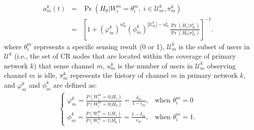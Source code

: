 \documentclass[12pt,onecolumn,draftclsnofoot]{IEEEtran} %
\begin{document}
\begin{eqnarray}\label{eq:AvailProb1}
	a_m^k(t) &=& \Pr(H_0|W_i^m=\theta_i^m, \; i \in \mathcal{U}_m^k, \pi_m^k) 
	         \nonumber \\ 
	&=& \left[ 1 + \left( \varphi_m^k \right)^{u_m^k} \left( \phi_m^k
	         \right)^{|\mathcal{U}_m^k|-u_m^k}
	      \frac{\Pr(H_1|\pi_m^k)}{\Pr(H_0|\pi_m^k)} \right]^{-1}.
\end{eqnarray}
where $\theta_i^m$ represents a specific sensing result (0 or 1), $\mathcal{U}_m^k$ is the subset of users in $\mathcal{U}^k$ (i.e., the set of CR nodes that are located within the coverage of primary network $k$) that sense channel $m$, $u_m^k$ is the number of users in $\mathcal{U}_m^k$ observing channel $m$ is idle, $\pi_m^k$ represents the history of channel $m$ in primary network $k$,
and $\varphi_m^k$ and $\phi_m^k$ are defined as: 
\begin{eqnarray}\label{eq:DefVarPhi}
\left\{
\begin{array}{ll}
\varphi_m^k=\frac{P(W_i^m=0|H_1)}{P(W_i^m=0|H_0)}=\frac{\delta_m}{1-\epsilon_m}, &
	  \mbox{when } \theta_i^m=0 \\
\phi_m^k=\frac{P(W_i^m=1|H_1)}{P(W_i^m=1|H_0)}=\frac{1-\delta_m}{\epsilon_m}, & 
	  \mbox{when } \theta_i^m=1 .
\end{array}\right.
\end{eqnarray}
\end{document}
